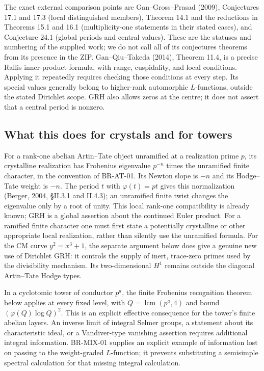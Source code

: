 \documentclass[11pt,a4paper]{article}
\theoremstyle{definition}\newtheorem{definition}[theorem]{Definition}
\theoremstyle{remark}\newtheorem{remark}[theorem]{Remark}
\begin{document}
The exact external comparison points are Gan--Gross--Prasad
(2009), Conjectures 17.1 and 17.3 (local distinguished members),
Theorem 14.1 and the reductions in Theorems 15.1 and 16.1
(multiplicity-one statements in their stated cases), and
Conjecture 24.1 (global periods and central values).  These are
the statuses and numbering of the supplied work; we do not call
all of its conjectures theorems from its presence in the ZIP.
Gan--Qiu--Takeda (2014), Theorem 11.4, is a precise Rallis
inner-product formula, with range, cuspidality, and local
conditions.  Applying it repeatedly requires checking those
conditions at every step.  Its special values generally belong
to higher-rank automorphic $L$-functions, outside the stated
Dirichlet scope.  GRH also allows zeros at the centre; it does
not assert that a central period is nonzero.

\subsection{What this does for crystals and for towers}

For a rank-one abelian Artin--Tate object unramified at a
realization prime $p$, its crystalline realization has Frobenius
eigenvalue $p^{-n}$ times the unramified finite character, in the
convention of BR-AT-01.  Its Newton slope is $-n$ and its
Hodge--Tate weight is $-n$.  The period $t$ with $\varphi(t)=pt$ gives this normalization
(Berger, 2004, \S II.3.1 and II.4.3); an unramified finite twist
changes the eigenvalue only by a root of unity.  This local rank-one
compatibility is already known; GRH is a global assertion about the continued
Euler product.  For a ramified finite character one must first
state a potentially crystalline or other appropriate local
realization, rather than silently use the unramified formula.
For the CM curve $y^2=x^3+1$, the separate argument below does
give a genuine new use of Dirichlet GRH: it controls the supply
of inert, trace-zero primes used by the divisibility mechanism.
Its two-dimensional $H^1$ remains outside the diagonal
Artin--Tate Hodge types.

In a cyclotomic tower of conductor $p^a$, the finite Frobenius
recognition theorem below applies at every fixed level, with
$Q=\operatorname{lcm}(p^a,4)$ and bound
$(\varphi(Q)\log Q)^2$.  This is an explicit effective
consequence for the tower's finite abelian layers.  An inverse
limit of integral Selmer groups, a statement about its
characteristic ideal, or a Vandiver-type vanishing assertion
requires additional integral information.  BR-MIX-01 supplies
an explicit example of information lost on passing to the
weight-graded $L$-function; it prevents substituting a
semisimple spectral calculation for that missing integral
calculation.
\end{document}
